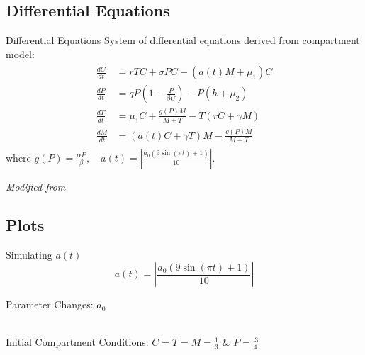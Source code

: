 \documentclass{beamer}
\begin{document}
\subsection{Differential Equations}
\begin{frame}{Differential Equations}
    System of differential equations derived from compartment model:
    \begin{align*}
        \begin{split}
            \frac{dC}{dt} &= rTC + \sigma PC- (a(t)M+\mu_{1})C\\
            \frac{dP}{dt} &= qP \left( 1-\frac{P}{\beta C} \right) - P \left( h+\mu_{2} \right)\\
            \frac{dT}{dt} &= \mu_{1}C + \frac{g(P)M}{M+T} - T(rC+\gamma M)\\
            \frac{dM}{dt} &= (a(t)C+ \gamma T)M - \frac{g(P)M}{M+T}
            \label{SoODE}
        \end{split}
    \end{align*}
    where $g(P) = \frac{\alpha P}{\beta}, \quad a(t)=|\frac{a_{0}(9\sin{(\pi t) }+1)}{10}|$.\\ 
    \quad
    \begin{center}
        \textit{Modified from \cite{13_blackwood_hastings_mumby_2010}}
    \end{center}
\end{frame}

\subsection{Plots}
\begin{frame}{Simulating $a(t)$}
    $$a(t)=|\frac{a_{0}(9\sin{(\pi t) }+1)}{10}|$$
    \begin{center}
    \end{center}
\end{frame}


\begin{frame}{Parameter Changes: $a_{0}$}
    \begin{center}
        \\
        Initial Compartment Conditions: $C=T=M=\frac{1}{3}$ \& $P=\frac{3}{4.}$
    \end{center}
\end{frame}
\end{document}
